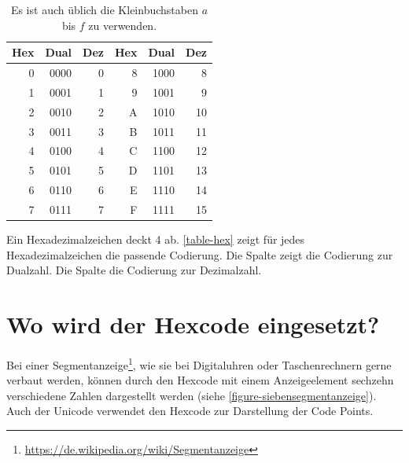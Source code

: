 \begin{table}[htb]
\centering
\begin{tabular}{|r|r|r||r|r|r|}
\hline
Hex & Dual & Dez & Hex & Dual & Dez \\ \hline
0 & 0000 & 0 & 8 & 1000 & 8 \\ \hline
1 & 0001 & 1 & 9 & 1001 & 9 \\ \hline
2 & 0010 & 2 & A & 1010 & 10 \\ \hline
3 & 0011 & 3 & B & 1011 & 11 \\ \hline
4 & 0100 & 4 & C & 1100 & 12 \\ \hline
5 & 0101 & 5 & D & 1101 & 13 \\ \hline
6 & 0110 & 6 & E & 1110 & 14 \\ \hline
7 & 0111 & 7 & F & 1111 & 15 \\ \hline
\end{tabular}
\caption{Es ist auch üblich die Kleinbuchstaben $a$ bis $f$ zu verwenden.}
\label{table-hex}
\end{table}

Ein Hexadezimalzeichen deckt \qty{4}{\bit} ab. \autoref{table-hex} zeigt für jedes Hexadezimalzeichen die passende Codierung. Die Spalte  zeigt die Codierung zur Dualzahl. Die Spalte  die Codierung zur Dezimalzahl.

\section{Wo wird der Hexcode eingesetzt?}

\begin{example}[Siebensegmentanzeige]
Bei einer Segmentanzeige\footnote{\url{https://de.wikipedia.org/wiki/Segmentanzeige}}, wie sie bei Digitaluhren oder Taschenrechnern gerne verbaut werden, können durch den Hexcode mit einem Anzeigeelement sechzehn verschiedene Zahlen dargestellt werden (siehe \autoref{figure-siebensegmentanzeige}). Auch der Unicode verwendet den Hexcode zur Darstellung der Code Points.
\end{example}

